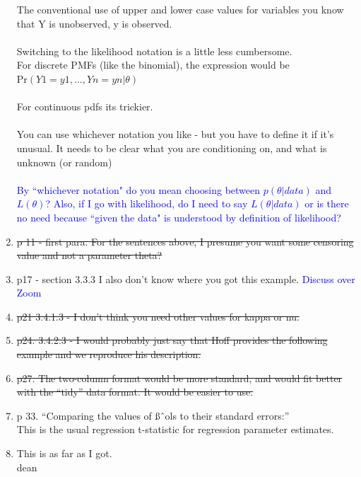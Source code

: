 \documentclass[12pt, a4paper]{article}
\begin{document}
\begin{enumerate}
    The conventional use of upper and lower case values for variables you know that Y is unobserved, y is observed.\\\\

    Switching to the likelihood notation is a little less cumbersome.  \\
    For discrete PMFs (like the binomial), the expression would be\\
    Pr$(Y1 = y1,...,Yn=yn | \theta)$\\\\

    For continuous pdfs its trickier.\\\\

    You can use whichever notation you like - but you have to define it if it’s unusual.  It needs to be clear what you are conditioning on, and what is unknown (or random)\\\\
    \textcolor{blue}{By ``whichever notation" do you mean choosing between $p(\theta|data)$ and $L(\theta)$?  Also, if I go with likelihood, do I need to say $L(\theta|data)$ or is there no need because ``given the data" is understood by definition of likelihood?}
  \item \sout{p 11 - first para.  For the sentences above, I presume you want some censoring value and not a parameter theta?}
  \item p17 - section 3.3.3  I also don't know where you got this example. \textcolor{blue}{Discuss over Zoom}
  \item \sout{p21 3.4.1.3 - I don't think you need other values for kappa or nu.}
  \item \sout{p24. 3.4.2.3 - I would probably just say that Hoff provides the following example and we reproduce his description.}
  \item \sout{p27. The two-column format would be more standard, and would fit better with the “tidy” data format.  It would be easier to use.}
  \item p 33.  ``Comparing the values of ßˆols to their standard errors:”\\
    This is the usual regression t-statistic for regression parameter estimates.
  \item This is as far as I got.\\
    dean

\end{enumerate}
\end{document}
